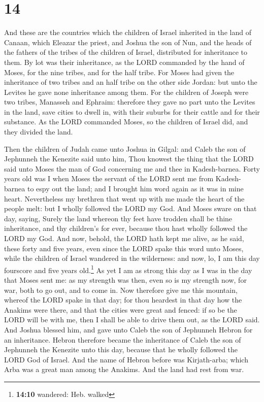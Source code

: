 \hypertarget{section-13}{%
\section{14}\label{section-13}}

 And these are the countries which the children of Israel
inherited in the land of Canaan, which Eleazar the priest, and Joshua
the son of Nun, and the heads of the fathers of the tribes of the
children of Israel, distributed for inheritance to them. 
By lot was their inheritance, as the LORD commanded by the hand of
Moses, for the nine tribes, and for the half tribe.  For
Moses had given the inheritance of two tribes and an half tribe on the
other side Jordan: but unto the Levites he gave none inheritance among
them.  For the children of Joseph were two tribes,
Manasseh and Ephraim: therefore they gave no part unto the Levites in
the land, save cities to dwell in, with their suburbs for their cattle
and for their substance.  As the LORD commanded Moses, so
the children of Israel did, and they divided the land.

 Then the children of Judah came unto Joshua in Gilgal:
and Caleb the son of Jephunneh the Kenezite said unto him, Thou knowest
the thing that the LORD said unto Moses the man of God concerning me and
thee in Kadesh-barnea.  Forty years old was I when Moses
the servant of the LORD sent me from Kadesh-barnea to espy out the land;
and I brought him word again as it was in mine heart. 
Nevertheless my brethren that went up with me made the heart of the
people melt: but I wholly followed the LORD my God.  And
Moses sware on that day, saying, Surely the land whereon thy feet have
trodden shall be thine inheritance, and thy children's for ever, because
thou hast wholly followed the LORD my God.  And now,
behold, the LORD hath kept me alive, as he said, these forty and five
years, even since the LORD spake this word unto Moses, while the
children of Israel wandered in the wilderness: and now, lo, I am this
day fourscore and five years old.\footnote{\textbf{14:10} wandered: Heb.
  walked}  As yet I am as strong this day as I was in the
day that Moses sent me: as my strength was then, even so is my strength
now, for war, both to go out, and to come in.  Now
therefore give me this mountain, whereof the LORD spake in that day; for
thou heardest in that day how the Anakims were there, and that the
cities were great and fenced: if so be the LORD will be with me, then I
shall be able to drive them out, as the LORD said.  And
Joshua blessed him, and gave unto Caleb the son of Jephunneh Hebron for
an inheritance.  Hebron therefore became the inheritance
of Caleb the son of Jephunneh the Kenezite unto this day, because that
he wholly followed the LORD God of Israel.  And the name
of Hebron before was Kirjath-arba; which Arba was a great man among the
Anakims. And the land had rest from war.

